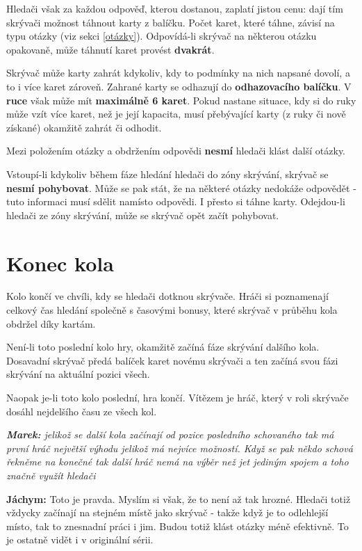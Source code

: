 \documentclass{book}
\newenvironment{reasoning}{\begin{small}\itshape}{\end{small}}
\begin{document}
Hledači však za každou odpověď, kterou dostanou, zaplatí jistou cenu: dají tím skrývači možnost táhnout karty z balíčku. Počet karet, které táhne, závisí na typu otázky (viz sekci \ref{otázky}). Odpovídá-li skrývač na některou otázku opakovaně, může táhnutí karet provést \textbf{dvakrát}.

Skrývač může karty zahrát kdykoliv, kdy to podmínky na nich napsané dovolí, a to i více karet zároveň. Zahrané karty se odhazují do \textbf{odhazovacího balíčku}. V \textbf{ruce} však může mít \textbf{maximálně 6 karet}. Pokud nastane situace, kdy si do ruky může vzít více karet, než je její kapacita, musí přebývající karty (z ruky či nově získané) okamžitě zahrát či odhodit.

Mezi položením otázky a obdržením odpovědi \textbf{nesmí} hledači klást další otázky.

Vstoupí-li kdykoliv během fáze hledání hledači do zóny skrývání, skrývač se \textbf{nesmí pohybovat}. Může se pak stát, že na některé otázky nedokáže odpovědět - tuto informaci musí sdělit namísto odpovědi. I přesto si táhne karty. Odejdou-li hledači ze zóny skrývání, může se skrývač opět začít pohybovat.

\section{Konec kola}

Kolo končí ve chvíli, kdy se hledači dotknou skrývače. Hráči si poznamenají celkový čas hledání společně s časovými bonusy, které skrývač v průběhu kola obdržel díky kartám.

Není-li toto poslední kolo hry, okamžitě začíná fáze skrývání dalšího kola. Dosavadní skrývač předá balíček karet novému skrývači a ten začíná svou fázi skrývání na aktuální pozici všech.

Naopak je-li toto kolo poslední, hra končí. Vítězem je hráč, který v roli skrývače dosáhl nejdelšího času ze všech kol.

\begin{reasoning}
	\textbf{Marek:} jelikož se další kola začínají od pozice posledního schovaného tak má první hráč největší výhodu jelikož má nejvíce možností. Když se pak někdo schová řekněme na konečné tak další hráč nemá na výběr než jet jediným spojem a toho značně využít hledači

	\textbf{Jáchym:} Toto je pravda. Myslím si však, že to není až tak hrozné. Hledači totiž vždycky začínají na stejném místě jako skrývač - takže když je to odlehlejší místo, tak to znesnadní práci i jim. Budou totiž klást otázky méně efektivně. To je ostatně vidět i v originální sérii.
\end{reasoning}
\end{document}

